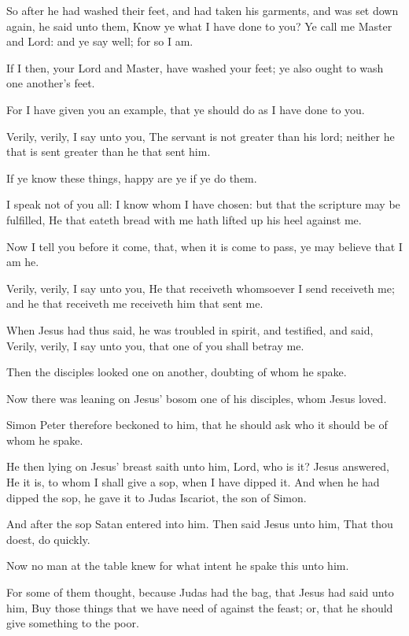 \verse So after he had washed their feet, and had taken his garments, and was set down again, he said unto them, Know ye what I have done to you?  \verse Ye call me Master and Lord: and ye say well; for so I am.

\verse If I then, your Lord and Master, have washed your feet; ye also ought to wash one another's feet.

\verse For I have given you an example, that ye should do as I have done to you.

\verse Verily, verily, I say unto you, The servant is not greater than his lord; neither he that is sent greater than he that sent him.

\verse If ye know these things, happy are ye if ye do them.

\verse I speak not of you all: I know whom I have chosen: but that the scripture may be fulfilled, He that eateth bread with me hath lifted up his heel against me.

\verse Now I tell you before it come, that, when it is come to pass, ye may believe that I am he.

\verse Verily, verily, I say unto you, He that receiveth whomsoever I send receiveth me; and he that receiveth me receiveth him that sent me.

\verse When Jesus had thus said, he was troubled in spirit, and testified, and said, Verily, verily, I say unto you, that one of you shall betray me.

\verse Then the disciples looked one on another, doubting of whom he spake.

\verse Now there was leaning on Jesus' bosom one of his disciples, whom Jesus loved.

\verse Simon Peter therefore beckoned to him, that he should ask who it should be of whom he spake.

\verse He then lying on Jesus' breast saith unto him, Lord, who is it?  \verse Jesus answered, He it is, to whom I shall give a sop, when I have dipped it. And when he had dipped the sop, he gave it to Judas Iscariot, the son of Simon.

\verse And after the sop Satan entered into him. Then said Jesus unto him, That thou doest, do quickly.

\verse Now no man at the table knew for what intent he spake this unto him.

\verse For some of them thought, because Judas had the bag, that Jesus had said unto him, Buy those things that we have need of against the feast; or, that he should give something to the poor.

